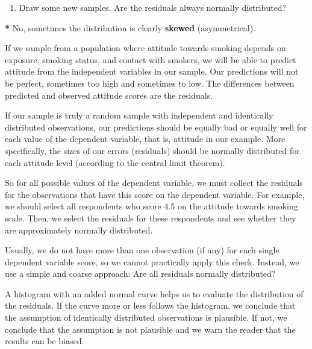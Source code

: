 \documentclass[a4paper]{book}
\newenvironment{Shaded}{\begin{snugshade}}{\end{snugshade}}
\newcommand{\KeywordTok}[1]{\textcolor[rgb]{0,0,0}{\textbf{#1}}}
\newcommand{\StringTok}[1]{\textcolor[rgb]{0.00,0.00,0.00}{#1}}
\newcommand{\OperatorTok}[1]{\textcolor[rgb]{0.00,0.00,0.00}{\textbf{#1}}}
\newcommand{\NormalTok}[1]{#1}
\providecommand{\tightlist}{%
  \setlength{\itemsep}{0pt}\setlength{\parskip}{0pt}}
\theoremstyle{definition}
\theoremstyle{definition}
\theoremstyle{definition}
\theoremstyle{remark}
\begin{document}
\begin{enumerate}
\def\labelenumi{\arabic{enumi}.}
\setcounter{enumi}{2}
\tightlist
\item
  Draw some new samples. Are the residuals always normally distributed?
\end{enumerate}

\begin{Shaded}
\begin{Highlighting}[]
\OperatorTok{*}\StringTok{ }\NormalTok{No, sometimes the distribution is clearly }\KeywordTok{skewed}\NormalTok{ (asymmetrical).}
\end{Highlighting}
\end{Shaded}

If we sample from a population where attitude towards smoking depends on
exposure, smoking status, and contact with smokers, we will be able to
predict attitude from the independent variables in our sample. Our
predictions will not be perfect, sometimes too high and sometimes to
low. The differences between predicted and observed attitude scores are
the residuals.

If our sample is truly a random sample with independent and identically
distributed observations, our predictions should be equally bad or
equally well for each value of the dependent variable, that is, attitude
in our example. More specifically, the sizes of our errors (residuals)
should be normally distributed for each attitude level (according to the
central limit theorem).

So for all possible values of the dependent variable, we must collect
the residuals for the observations that have this score on the dependent
variable. For example, we should select all respondents who score 4.5 on
the attitude towards smoking scale. Then, we select the residuals for
these respondents and see whether they are approximately normally
distributed.

Usually, we do not have more than one observation (if any) for each
single dependent variable score, so we cannot practically apply this
check. Instead, we use a simple and coarse approach: Are all residuals
normally distributed?

A histogram with an added normal curve helps us to evaluate the
distribution of the residuals. If the curve more or less follows the
histogram, we conclude that the assumption of identically distributed
observations is plausible. If not, we conclude that the assumption is
not plausible and we warn the reader that the results can be biased.
\end{document}
